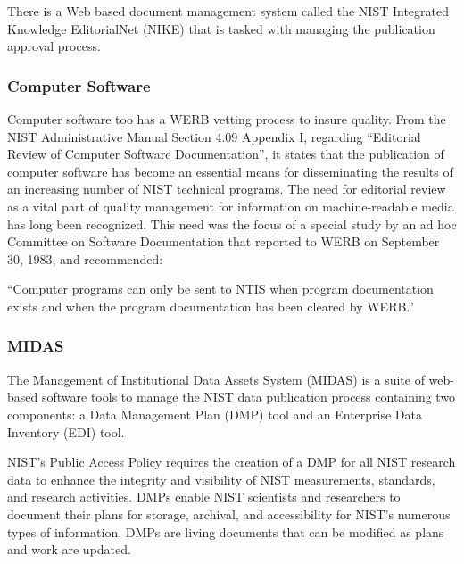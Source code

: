 There is a Web based document management system called the NIST Integrated Knowledge EditorialNet (NIKE) that is tasked with managing the publication approval process.

\subsubsection{Computer Software}

Computer software too has a WERB vetting process to insure quality.   
From the NIST Administrative Manual Section 4.09 Appendix I, regarding ``Editorial Review of Computer Software Documentation'', it states that the publication of  computer software has become an essential means for disseminating the results of an increasing number of NIST technical programs. The need for editorial review as a vital part of quality management for information on machine-readable media has long been recognized. This need was the focus of a special study by an ad hoc Committee on Software Documentation that reported to WERB on September 30, 1983, and recommended:    

``Computer programs can only be sent to NTIS when program documentation exists and when the program documentation has been cleared by WERB.''





\subsubsection{MIDAS}
The  Management of Institutional Data Assets System (MIDAS)  is a suite of web-based software tools to manage the NIST data publication process containing  two components: a Data Management Plan (DMP) tool and an Enterprise Data Inventory (EDI) tool. 

NIST's Public Access Policy requires the creation of a DMP for all NIST research data to enhance the integrity and visibility of NIST measurements, standards, and research activities. DMPs enable NIST scientists and researchers to document their plans for storage, archival, and accessibility for NIST’s numerous types of information. DMPs are living documents that can be modified as plans and work are updated.

